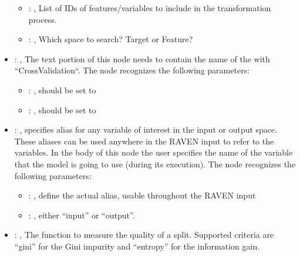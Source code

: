 \begin{itemize}
\begin{itemize}
        \item {}: , 
          List of IDs of features/variables to include in the transformation process.

        \item {}: , 
          Which space to search? Target or Feature?
      \end{itemize}

    \item {}: , 
      The text portion of this node needs to contain the name of the  with
               ``CrossValidation``.
      The  node recognizes the following parameters:
        \begin{itemize}
          \item {}: , 
            should be set to 
          \item {}: , 
            should be set to 
      \end{itemize}

    \item {}: , 
      specifies alias for         any variable of interest in the input or output space. These
      aliases can be used anywhere in the RAVEN input to         refer to the variables. In the body
      of this node the user specifies the name of the variable that the model is going to use
      (during its execution).
      The  node recognizes the following parameters:
        \begin{itemize}
          \item {}: , 
            define the actual alias, usable throughout the RAVEN input
          \item {}: , 
            either ``input'' or ``output''.
      \end{itemize}

    \item {}: , 
      The function to measure the quality of a split. Supported criteria are ``gini'' for the
      Gini impurity and ``entropy'' for the information gain.


\end{itemize}
